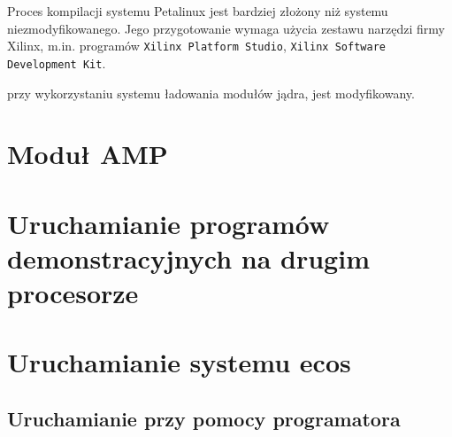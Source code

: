 Proces kompilacji systemu Petalinux jest bardziej złożony niż systemu niezmodyfikowanego. Jego przygotowanie wymaga użycia zestawu narzędzi firmy Xilinx, m.in. programów \texttt{Xilinx Platform Studio}, \texttt{Xilinx Software Development Kit}.


przy wykorzystaniu systemu ładowania modułów jądra, jest modyfikowany. 



\section{Moduł AMP} 
\label{sec:modu_amp}




\section{Uruchamianie programów demonstracyjnych na drugim procesorze} 
\label{sec:uruchamianie_program_w_demonstracyjnych_na_drugim_procesorze}





\section{Uruchamianie systemu ecos} 
\label{sec:uruchamianie_systemu_ecos}


\subsection{Uruchamianie przy pomocy programatora}
\label{ssub:uruchamianie_przy_pomocy_programatora}





